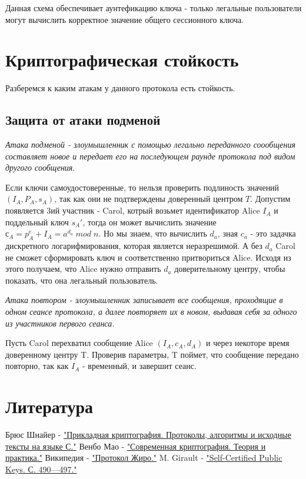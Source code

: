 \documentclass[a4paper]{article}
\begin{document}
Данная схема обеспечивает аунтефикацию ключа - только легальные пользователи могут вычислить корректное значение общего сессионного ключа.
\section{Криптографическая стойкость}
Разберемся к каким атакам у данного протокола есть стойкость.
\subsection{Защита от атаки подменой}
\textit{Атака подменой - злоумышленник с помощью легально переданного соообщения составляет новое и передает его на последующем раунде протокола под видом другого сообщения}.
\\
\par 
Если ключи самоудостоверенные, то нельзя проверить подлиность значений $(I_A, P_A, s_A)$, так как они не подтверждены доверенный центром $T$.
Допустим появляется 3ий участник - Carol, котрый возьмет идентификатор Alice $I_A$ и поддельный ключ $s_A'$, тогда он может вычислить значение $с_A = p_A^e + I_A = a^{d_a} \; mod \; n$. Но мы знаем, что вычислить $d_a$, зная $c_a$ -  это задачка дискретного логарифмирования, которая является неразрешимой.
А без $d_a$ Carol не сможет сформировать ключ и соответственно притвориться Alice. Исходя из этого получаем, что Alice нужно отправить $d_a$ доверительному центру, чтобы показать, что она легальный пользователь.
\\
\par
\textit{Атака повтором - злоумышленник записывает все сообщения, проходящие в одном сеансе протокола, а далее повторяет их в новом, выдавая себя за одного из участников первого сеанса.}
\\
\par Пусть Carol перехватил сообщение Alice $(I_A, c_A, d_A)$ и через некоторе время доверенному центру T. Проверив параметры, T поймет, что сообщение передано повторно, так как $I_A$ - временный, и завершит сеанс. 
\section{Литература}

\begin{thebibliography}{}
      Брюс Шнайер -  \href{https://lib.mipt.ru/book/n/00013022000cdbe8096da0a688d3a130/Shnaier-B-Prikladnaya-kriptografiya-Protokoly-algoritmy-i-ishodnye-teksty-na-yazyke-S.pdf}{"Прикладная криптография. Протоколы, алгоритмы и исходные тексты на языке С."}
      Венбо Мао -  \href{https://lib.mipt.ru/book/266371/?q=+криптографические+протоколы}{"Современная криптография. Теория и практика."}
      Википедия -  \href{https://ru.wikipedia.org/wiki/Протокол_Жиро}{"Протокол Жиро."}
      M. Girault -  \href{https://doi.org/10.1007/3-540-46416-6_42}{"Self-Certified Public Keys. С. 490—497."}
\end{thebibliography}
\end{document}

